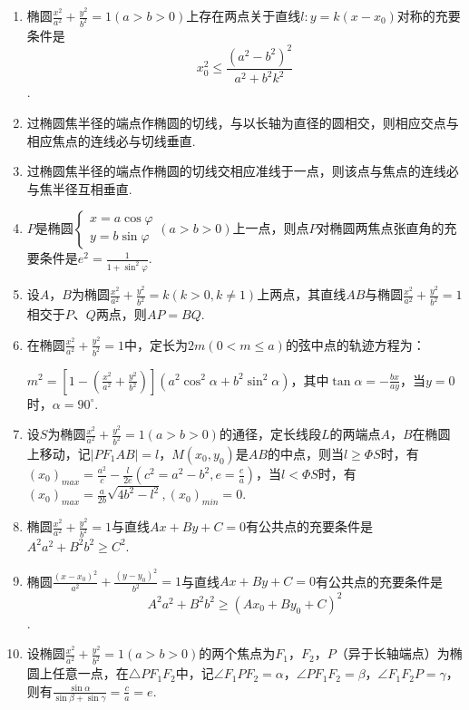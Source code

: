 \documentclass{article}
\begin{document}
\begin{enumerate}[label=\arabic*.]
\item 椭圆$\frac{x^2}{a^2} + \frac{y^2}{b^2} = 1 \left(a > b > 0\right)$上存在两点关于直线$l:y=k\left(x - x_0\right)$对称的充要条件是$$x_0^2 \leq \frac{(a^2-b^2)^2}{a^2+b^2k^2}$$.

\item 过椭圆焦半径的端点作椭圆的切线，与以长轴为直径的圆相交，则相应交点与相应焦点的连线必与切线垂直. 

\item 过椭圆焦半径的端点作椭圆的切线交相应准线于一点，则该点与焦点的连线必与焦半径互相垂直. 

\item $P$是椭圆$ 
\begin{cases}
    x=a\cos\varphi \\
    y=b\sin\varphi
\end{cases}(a>b>0)$上一点，则点$P$对椭圆两焦点张直角的充要条件是$e^2=\frac{1}{1+\sin^2\varphi}$. 

\item 设$A$，$B$为椭圆$\frac{x^2}{a^2} + \frac{y^2}{b^2} =k\left(k>0, k\neq 1\right)$上两点，其直线$AB$与椭圆$\frac{x^2}{a^2} + \frac{y^2}{b^2} = 1$相交于$P$、$Q$两点，则$AP=BQ$. 

\item 在椭圆$\frac{x^2}{a^2} + \frac{y^2}{b^2} = 1$中，定长为$2m\left(0<m\leq a\right)$的弦中点的轨迹方程为：

$m^2=\left[1-\left(\frac{x^2}{a^2} + \frac{y^2}{b^2}\right)\right]\left(a^2\cos^2\alpha+b^2\sin^2\alpha\right)$，其中$\tan\alpha=-\frac{bx}{ay}$，当$y=0$时，$\alpha=90^\circ$. 

\item 设$S$为椭圆$\frac{x^2}{a^2} + \frac{y^2}{b^2} = 1 \left(a > b > 0\right)$的通径，定长线段$L$的两端点$A$，$B$在椭圆上移动，记$\left| PF_1 AB\right|=l$，$M\left(x_0,y_0\right)$是$AB$的中点，则当$l \ge\Phi S$时，有$\left(x_0\right)_{max}=\frac{a^2}{c}-\frac{l}{2e}\left(c^2=a^2-b^2,e=\frac{c}{a}\right)$，当$l<\Phi S$时，有$\left(x_0\right)_{max}=\frac{a}{2b}\sqrt{4b^2-l^2},\left(x_0\right)_{min}=0$. 

\item 椭圆$\frac{x^2}{a^2} + \frac{y^2}{b^2} = 1$与直线$Ax+By+C=0$有公共点的充要条件是$A^2a^2+B^2b^2\ge C^2$. 

\item 椭圆$\frac{\left(x-x_0\right)^2}{a^2} + \frac{\left(y-y_0\right)^2}{b^2} = 1$与直线$Ax+By+C=0$有公共点的充要条件是
$$A^2a^2+B^2b^2\ge (Ax_0+By_0+C)^2$$. 

\item 设椭圆$\frac{x^2}{a^2} + \frac{y^2}{b^2} = 1 \left(a > b > 0\right)$的两个焦点为$F_1$，$F_2$，$P$（异于长轴端点）为椭圆上任意一点，在$\triangle PF_1F_2$中，记$\angle F_1PF_2 =\alpha$，$\angle PF_1F_2=\beta $，$\angle F_1F_2P = \gamma$，则有$\frac{\sin \alpha}{\sin\beta +\sin\gamma}=\frac{c}{a}=e$. 


\end{enumerate}
\end{document}
